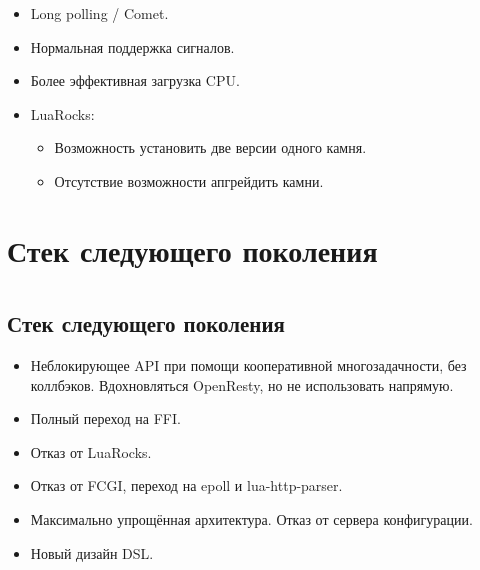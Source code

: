 \documentclass[aspectratio=169,handout,bigger]{beamer}
\begin{document}
\begin{frame}
  \begin{itemize}
    \item Long polling / Comet.
    \item Нормальная поддержка сигналов.
    \item Более эффективная загрузка CPU.
    \item LuaRocks:
    \begin{itemize}
      \item Возможность установить две версии одного камня.
      \item Отсутствие возможности апгрейдить камни.
    \end{itemize}
  \end{itemize}
\end{frame}


\section{Стек следующего поколения}


\section*{}
\subsection*{Стек следующего поколения}

\begin{frame}
  \begin{itemize}
    \item Неблокирующее API при помощи кооперативной многозадачности, без коллбэков. Вдохновляться OpenResty, но не использовать напрямую.
    \item Полный переход на FFI.
    \item Отказ от LuaRocks.
    \item Отказ от FCGI, переход на epoll и lua-http-parser.
    \item Максимально упрощённая архитектура. Отказ от сервера конфигурации.
    \item Новый дизайн DSL.
  \end{itemize}
\end{frame}
\end{document}
